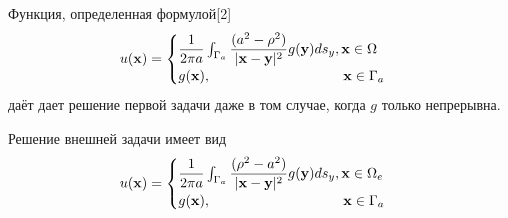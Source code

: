 \documentclass[14pt, a4paper]{extarticle}
\begin{document}
					Функция, определенная формулой[2]
					\begin{equation}
						u(\mathbf{x}) = \begin{cases} \dfrac{1}{2\pi a} \int_{\Gamma_a} \dfrac{(a^2-\rho^2)}{|\mathbf{x} - \mathbf{y}|^2} g(\mathbf{y}) ds_y, \mathbf{x} \in \Omega \\ g(\mathbf{x}), \hphantom{\int_{\Gamma_a} \dfrac{(a^2-\rho^2)}{|\mathbf{x} - \mathbf{y}|^2} g(\mathbf{y}) ds_y,}  \mathbf{x} \in \Gamma_a \end{cases} \label{38}
					\end{equation}
					даёт дает решение первой задачи даже в том случае, когда $g$ только непрерывна.
					
					Решение внешней задачи имеет вид
					\begin{equation}
						u(\mathbf{x}) = \begin{cases} \dfrac{1}{2\pi a} \int_{\Gamma_a} \dfrac{(\rho^2-a^2)}{|\mathbf{x} - \mathbf{y}|^2} g(\mathbf{y}) ds_y, \mathbf{x} \in \Omega_e \\ g(\mathbf{x}), \hphantom{\int_{\Gamma_a} \dfrac{(a^2-\rho^2)}{|\mathbf{x} - \mathbf{y}|^2} g(\mathbf{y}) ds_y,}  \mathbf{x} \in \Gamma_a \end{cases}
					\end{equation}
					
\end{document}
